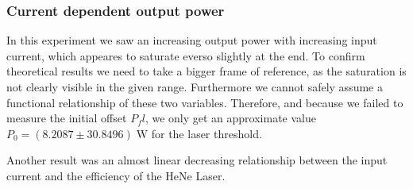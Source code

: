\documentclass[../main.tex]{subfiles}
\begin{document}
    \subsubsection*{Current dependent output power}
        In this experiment we saw an increasing output power with increasing input current, which appeares to saturate everso slightly at the end. To confirm theoretical results we need to take a bigger frame of reference, as the saturation is not clearly visible in the given range. Furthermore we cannot safely assume a functional relationship of these two variables. Therefore, and because we failed to measure the initial offset $P_fl$, we only get an approximate value $P_0 = (8.2087\pm 30.8496)\;\si{\W}$ for the laser threshold.

        Another result was an almost linear decreasing relationship between the input current and the efficiency of the HeNe Laser. 
\end{document}

